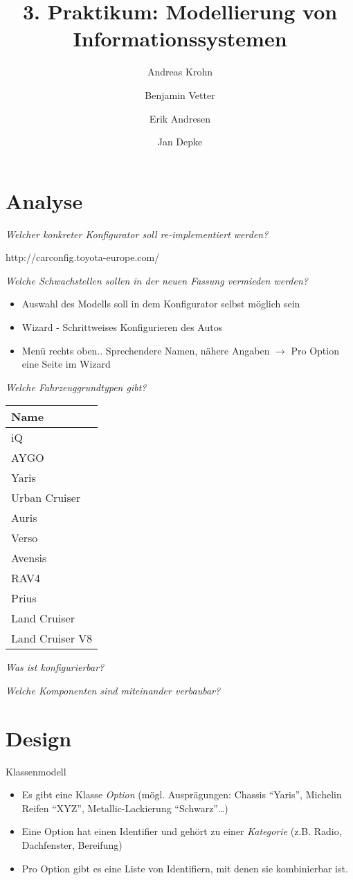 \documentclass[a4paper,10pt]{article}
\title{3. Praktikum: Modellierung von Informationssystemen}
\author{Andreas Krohn \and Benjamin Vetter \and Erik Andresen \and Jan Depke}
\begin{document}
\maketitle

\tableofcontents

\section{Analyse}
\emph{Welcher konkreter Konfigurator soll re-implementiert werden?}

http://carconfig.toyota-europe.com/

\emph{Welche Schwachstellen sollen in der neuen Fassung vermieden werden?}

\begin{itemize}
 \item Auswahl des Modells soll in dem Konfigurator selbst möglich sein
 \item Wizard - Schrittweises Konfigurieren des Autos
 \item Menü rechts oben.. Sprechendere Namen, nähere Angaben $\rightarrow$ Pro Option eine Seite im Wizard
\end{itemize}

\emph{Welche Fahrzeuggrundtypen gibt?}

\begin{tabular}{|l|}
\hline
Name \\
\hline
iQ \\
AYGO \\
Yaris \\
Urban Cruiser \\
Auris \\
Verso \\
Avensis \\
RAV4 \\
Prius \\
Land Cruiser \\
Land Cruiser V8 \\
\hline
\end{tabular}

\emph{Was ist konfigurierbar?}

\emph{Welche Komponenten sind miteinander verbaubar?}

\section{Design}
Klassenmodell
\begin{itemize}
 \item Es gibt eine Klasse \emph{Option} (mögl. Ausprägungen: Chassis "`Yaris"', Michelin Reifen "`XYZ"', Metallic-Lackierung "`Schwarz"'\ldots)
 \item Eine Option hat einen Identifier und gehört zu einer \emph{Kategorie} (z.B. Radio, Dachfenster, Bereifung)
 \item Pro Option gibt es eine Liste von Identifiern, mit denen sie kombinierbar ist.
\end{itemize}
\end{document}
